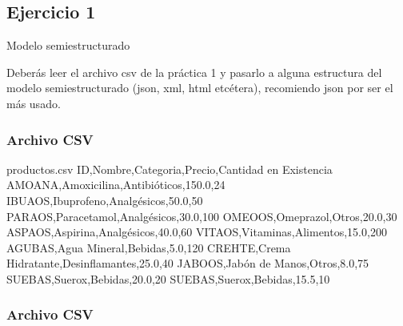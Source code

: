\documentclass[a4paper,12pt]{article}
\begin{document}
\subsection*{Ejercicio 1}

Modelo semiestructurado

Deberás leer el archivo csv de la práctica 1 y pasarlo a alguna estructura del modelo
semiestructurado (json, xml, html etcétera), recomiendo json por ser el más usado.


\subsubsection*{Archivo CSV}

\begin{filecontents*}{productos.csv}
    ID,Nombre,Categoria,Precio,Cantidad en Existencia
    AMOANA,Amoxicilina,Antibióticos,150.0,24
    IBUAOS,Ibuprofeno,Analgésicos,50.0,50
    PARAOS,Paracetamol,Analgésicos,30.0,100
    OMEOOS,Omeprazol,Otros,20.0,30
    ASPAOS,Aspirina,Analgésicos,40.0,60
    VITAOS,Vitaminas,Alimentos,15.0,200
    AGUBAS,Agua Mineral,Bebidas,5.0,120
    CREHTE,Crema Hidratante,Desinflamantes,25.0,40
    JABOOS,Jabón de Manos,Otros,8.0,75
    SUEBAS,Suerox,Bebidas,20.0,20
    SUEBAS,Suerox,Bebidas,15.5,10
\end{filecontents*}


\subsubsection*{Archivo CSV}

\end{document}
